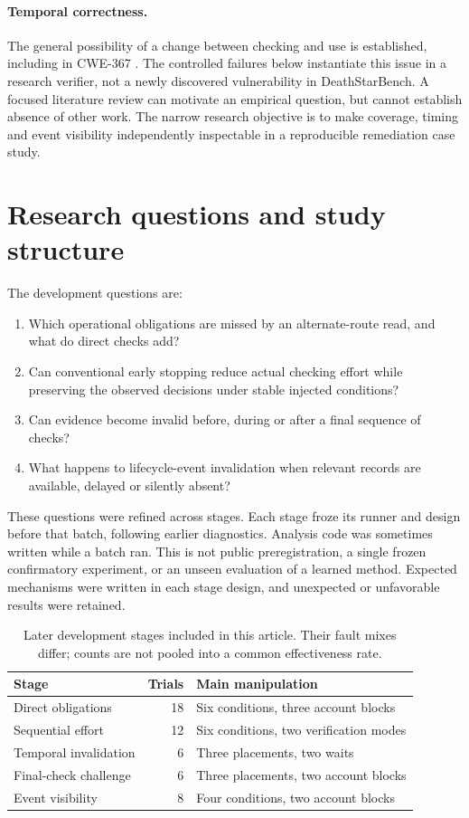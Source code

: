 \documentclass[11pt]{article}
\begin{document}
\paragraph{Temporal correctness.}
The general possibility of a change between checking and use is established, including in CWE-367 \cite{cwe}. The controlled failures below instantiate this issue in a research verifier, not a newly discovered vulnerability in DeathStarBench. A focused literature review can motivate an empirical question, but cannot establish absence of other work. The narrow research objective is to make coverage, timing and event visibility independently inspectable in a reproducible remediation case study.

\section{Research questions and study structure}
The development questions are:
\begin{enumerate}
\item Which operational obligations are missed by an alternate-route read, and what do direct checks add?
\item Can conventional early stopping reduce actual checking effort while preserving the observed decisions under stable injected conditions?
\item Can evidence become invalid before, during or after a final sequence of checks?
\item What happens to lifecycle-event invalidation when relevant records are available, delayed or silently absent?
\end{enumerate}

These questions were refined across stages. Each stage froze its runner and design before that batch, following earlier diagnostics. Analysis code was sometimes written while a batch ran. This is not public preregistration, a single frozen confirmatory experiment, or an unseen evaluation of a learned method. Expected mechanisms were written in each stage design, and unexpected or unfavorable results were retained.

\begin{table}[ht]
\centering\small
\begin{tabular}{lrl}
\toprule Stage & Trials & Main manipulation \\
\midrule
Direct obligations & 18 & Six conditions, three account blocks \\
Sequential effort & 12 & Six conditions, two verification modes \\
Temporal invalidation & 6 & Three placements, two waits \\
Final-check challenge & 6 & Three placements, two account blocks \\
Event visibility & 8 & Four conditions, two account blocks \\
\bottomrule
\end{tabular}
\caption{Later development stages included in this article. Their fault mixes differ; counts are not pooled into a common effectiveness rate.}
\label{tab:stages}
\end{table}
\end{document}
